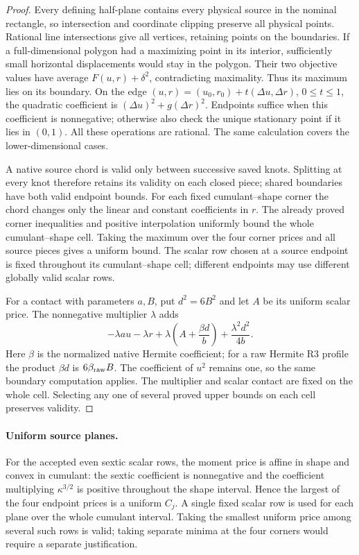 \documentclass[11pt]{article}
\begin{document}
\begin{proof}
Every defining half-plane contains every physical source in the nominal
rectangle, so intersection and coordinate clipping preserve all physical
points. Rational line intersections give all vertices, retaining points
on the boundaries. If a full-dimensional polygon had a maximizing point
in its interior, sufficiently small horizontal displacements would stay
in the polygon. Their two objective values have average
$F(u,r)+\delta^2$, contradicting maximality. Thus its maximum lies on its
boundary. On the edge $(u,r)=(u_0,r_0)+t(\Delta u,\Delta r)$,
$0\le t\le1$, the quadratic coefficient is
$(\Delta u)^2+g(\Delta r)^2$. Endpoints suffice when this coefficient is
nonnegative; otherwise also check the unique stationary point if it lies
in $(0,1)$. All these operations are rational. The same calculation covers
the lower-dimensional cases.

A native source chord is valid only between successive saved knots.
Splitting at every knot therefore retains its validity on each closed
piece; shared boundaries have both valid endpoint bounds. For each fixed
cumulant--shape corner the chord changes only the linear and constant
coefficients in $r$. The already proved corner inequalities and positive
interpolation uniformly bound the whole cumulant--shape cell. Taking the
maximum over the four corner prices and all source pieces gives a uniform
bound. The scalar row chosen at a source endpoint is fixed throughout its
cumulant--shape cell; different endpoints may use different globally
valid scalar rows.

For a contact with parameters $a,B$, put $d^2=6B^2$ and let $A$ be its
uniform scalar price. The nonnegative multiplier $\lambda$ adds
\[
 -\lambda a u-\lambda r+
 \lambda\left(A+\frac{\beta d}{b}\right)
 +\frac{\lambda^2d^2}{4b}.
\]
Here $\beta$ is the normalized native Hermite coefficient; for a raw
Hermite R3 profile the product $\beta d$ is $6\beta_{\rm raw}B$.
The coefficient of $u^2$ remains one, so the same boundary computation
applies. The multiplier and scalar contact are fixed on the whole
cell. Selecting any one of several proved upper bounds on each cell
preserves validity.
\end{proof}

\paragraph{Uniform source planes.}
For the accepted even sextic scalar rows, the moment price is affine in
shape and convex in cumulant: the sextic coefficient is nonnegative and
the coefficient multiplying $\kappa^{3/2}$ is positive throughout the
shape interval. Hence the largest of the four endpoint prices is a
uniform $C_j$. A single fixed scalar row is used for each plane over the
whole cumulant interval. Taking the smallest uniform price among several
such rows is valid; taking separate minima at the four corners would
require a separate justification.
\end{document}
